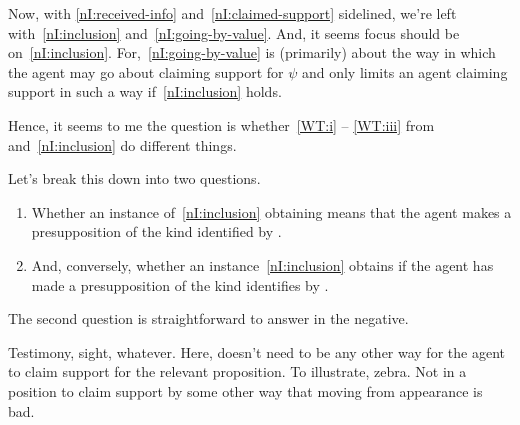\begin{note}
  Now, with \ref{nI:received-info} and~\ref{nI:claimed-support} sidelined, we're left with~\ref{nI:inclusion} and~\ref{nI:going-by-value}.
  And, it seems focus should be on~\ref{nI:inclusion}.
  For,~\ref{nI:going-by-value} is (primarily) about the way in which the agent may go about claiming support for \(\psi\) and \nI{} only limits an agent claiming support in such a way if~\ref{nI:inclusion} holds.

  Hence, it seems to me the question is whether~\ref{WT:i} -- \ref{WT:iii} from \wrt{} and~\ref{nI:inclusion} do different things.
\end{note}

\begin{note}
  Let's break this down into two questions.

  \begin{enumerate}
  \item Whether an instance of~\ref{nI:inclusion} obtaining means that the agent makes a presupposition of the kind identified by \wrt{}.
  \item And, conversely, whether an instance~\ref{nI:inclusion} obtains if the agent has made a presupposition of the kind identifies by \wrt{}.
  \end{enumerate}
\end{note}

\begin{note}
  The second question is straightforward to answer in the negative.

  Testimony, sight, whatever.
  Here, doesn't need to be any other way for the agent to claim support for the relevant proposition.
  {
    \color{red}
    To illustrate, zebra.
    Not in a position to claim support by some other way that moving from appearance is bad.
  }
\end{note}

